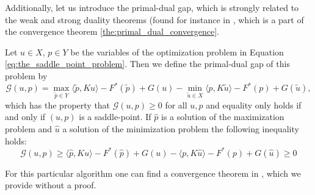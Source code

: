     Additionally, let us introduce the primal-dual gap, which is strongly related to the weak and strong duality theorems (found for instance in \cite{Geiger-Kanzow}, which is a part of the convergence theorem \ref{the:primal_dual_convergence}.
    \begin{definition} %
    \label{def:primal_dual_gap}

        Let $u \in X$, $p \in Y$ be the variables of the optimization problem in Equation \ref{eq:the_saddle_point_problem}. Then we define the primal-dual gap of this problem by
            \begin{equation}
                \mathcal{G}(u, p) = \max_{\tilde{p} \in Y} \langle \tilde{p}, Ku \rangle - F^{\ast}(\tilde{p}) + G(u) - \min_{\tilde{u} \in X} \langle p, K\tilde{u} \rangle - F^{\ast}(p) + G(\tilde{u}),
                \label{eq:primal_dual_gap}
            \end{equation}
        which has the property that $\mathcal{G}(u, p) \ge 0$ for all $u, p$ and equality only holds if and only if $(u, p)$ is a saddle-point. If $\hat{p}$ is a solution of the maximization problem and $\hat{u}$ a solution of the minimization problem the following inequality holds:
            $$
                \mathcal{G}(u, p) \ge \langle \hat{p}, Ku \rangle - F^{\ast}(\hat{p}) + G(u) - \langle p, K\hat{u} \rangle - F^{\ast}(p) + G(\hat{u}) \ge 0
            $$
    \end{definition}

    For this particular algorithm one can find a convergence theorem in \cite{Chambolle10afirst-order}, which we provide without a proof.

